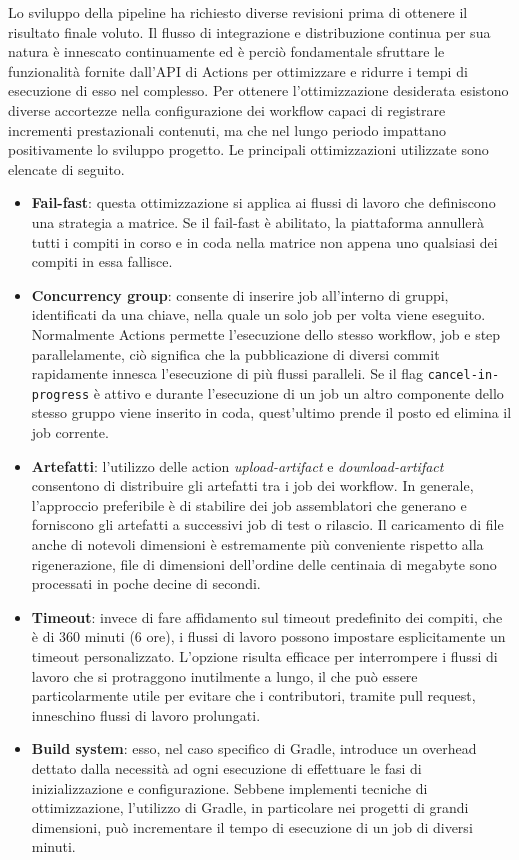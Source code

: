 Lo sviluppo della pipeline ha richiesto diverse revisioni prima di ottenere il risultato finale voluto. Il flusso di integrazione e distribuzione continua per sua natura è innescato continuamente ed è perciò fondamentale sfruttare le funzionalità fornite dall'API di Actions per ottimizzare e ridurre i tempi di esecuzione di esso nel complesso. Per ottenere l'ottimizzazione desiderata esistono diverse accortezze nella configurazione dei workflow capaci di registrare incrementi prestazionali contenuti, ma che nel lungo periodo impattano positivamente lo sviluppo progetto. Le principali ottimizzazioni utilizzate sono elencate di seguito.
\begin{itemize}
	\item \textbf{Fail-fast}: questa ottimizzazione si applica ai flussi di lavoro che definiscono una strategia a matrice. Se il fail-fast è abilitato, la piattaforma annullerà tutti i compiti in corso e in coda nella matrice non appena uno qualsiasi dei compiti in essa fallisce.
	\item \textbf{Concurrency group}: consente di inserire job all'interno di gruppi, identificati da una chiave, nella quale un solo job per volta viene eseguito. Normalmente Actions permette l'esecuzione dello stesso workflow, job e step parallelamente, ciò significa che la pubblicazione di diversi commit rapidamente  innesca l'esecuzione di più flussi paralleli. Se il flag \texttt{cancel-in-progress} è attivo e durante l'esecuzione di un job un altro componente dello stesso gruppo viene inserito in coda, quest'ultimo prende il posto ed elimina il job corrente.
	\item \textbf{Artefatti}: l'utilizzo delle action \textit{upload-artifact} e \textit{download-artifact} consentono di distribuire gli artefatti tra i job dei workflow. In generale, l'approccio preferibile è di stabilire dei job assemblatori che generano e forniscono gli artefatti a successivi job di test o rilascio. Il caricamento di file anche di notevoli dimensioni è estremamente più conveniente rispetto alla rigenerazione, file di dimensioni dell'ordine delle centinaia di megabyte sono processati in poche decine di secondi.
	\item \textbf{Timeout}: invece di fare affidamento sul timeout predefinito dei compiti, che è di 360 minuti (6 ore), i flussi di lavoro possono impostare esplicitamente un timeout personalizzato. L'opzione risulta efficace per interrompere i flussi di lavoro che si protraggono inutilmente a lungo, il che può essere particolarmente utile per evitare che i contributori, tramite pull request, inneschino flussi di lavoro prolungati.
	\item \textbf{Build system}: esso, nel caso specifico di Gradle, introduce un overhead dettato dalla necessità ad ogni esecuzione di effettuare le fasi di inizializzazione e configurazione. Sebbene implementi tecniche di ottimizzazione, l'utilizzo di Gradle, in particolare nei progetti di grandi dimensioni, può incrementare il tempo di esecuzione di un job di diversi minuti.
\end{itemize}



